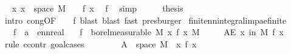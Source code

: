 \begin{isabellebody}
\ \isamarkupfalse%
\ {\isachardoublequoteopen}{\isasymAnd}x{\isachardot}{\kern0pt}\ x\ {\isasymin}\ space\ M\ {\isasymLongrightarrow}\ {}\ {\isasymle}\ f\ x{\isachardoublequoteclose}\ \isamarkupfalse%
\ f{\isacharparenleft}{\kern0pt}{}{\isacharparenright}{\kern0pt}\ \isamarkupfalse%
\ simp\isanewline
\ \ \isamarkupfalse%
\ \isamarkupfalse%
\ {\isacharquery}{\kern0pt}thesis\ \isamarkupfalse%
\ {\isacharparenleft}{\kern0pt}intro\ cong{\isacharbrackleft}{\kern0pt}OF\ {\isacharunderscore}{\kern0pt}\ {\isacharunderscore}{\kern0pt}\ {\isacharunderscore}{\kern0pt}\ f{\isacharparenleft}{\kern0pt}{}{\isacharcomma}{\kern0pt}{}{\isacharparenright}{\kern0pt}{\isacharbrackright}{\kern0pt}{\isacharcomma}{\kern0pt}\ blast{\isacharcomma}{\kern0pt}\ blast{\isacharcomma}{\kern0pt}\ fast{\isacharparenright}{\kern0pt}\ presburger{\isacharplus}{\kern0pt}\isanewline
{}\isamarkupfalse%
%
\endisatagproof
{\isafoldproof}%
%
\isadelimproof
%
\endisadelimproof
\isanewline
\isanewline
{}\isamarkupfalse%
\ finite{\isacharunderscore}{\kern0pt}nn{\isacharunderscore}{\kern0pt}integral{\isacharunderscore}{\kern0pt}imp{\isacharunderscore}{\kern0pt}ae{\isacharunderscore}{\kern0pt}finite{\isacharcolon}{\kern0pt}\isanewline
\ \ \ f\ {\isacharcolon}{\kern0pt}{\isacharcolon}{\kern0pt}\ {\isachardoublequoteopen}{\isacharprime}{\kern0pt}a\ {\isasymRightarrow}\ ennreal{\isachardoublequoteclose}\isanewline
\ \ \ {\isachardoublequoteopen}f\ {\isasymin}\ borel{\isacharunderscore}{\kern0pt}measurable\ M{\isachardoublequoteclose}\ {\isachardoublequoteopen}{\isacharparenleft}{\kern0pt}{\isasymintegral}\isactrlsup {\isacharplus}{\kern0pt}x{\isachardot}{\kern0pt}\ f\ x\ {\isasympartial}M{\isacharparenright}{\kern0pt}\ {\isacharless}{\kern0pt}\ {\isasyminfinity}{\isachardoublequoteclose}\isanewline
\ \ \ {\isachardoublequoteopen}AE\ x\ in\ M{\isachardot}{\kern0pt}\ f\ x\ {\isacharless}{\kern0pt}\ {\isasyminfinity}{\isachardoublequoteclose}\isanewline
%
\isadelimproof
%
\endisadelimproof
%
\isatagproof
{}\isamarkupfalse%
\ {\isacharparenleft}{\kern0pt}rule\ ccontr{\isacharcomma}{\kern0pt}\ goal{\isacharunderscore}{\kern0pt}cases{\isacharparenright}{\kern0pt}\isanewline
\ \ \isamarkupfalse%
\ {}\isanewline
\ \ \isamarkupfalse%
\ {\isacharquery}{\kern0pt}A\ {\isacharequal}{\kern0pt}\ {\isachardoublequoteopen}space\ M\ {\isasyminter}\ {\isacharbraceleft}{\kern0pt}x{\isachardot}{\kern0pt}\ f\ x\ {\isacharequal}{\kern0pt}\ {\isasyminfinity}{\isacharbraceright}{\kern0pt}{\isachardoublequoteclose}\isanewline

\end{isabellebody}
